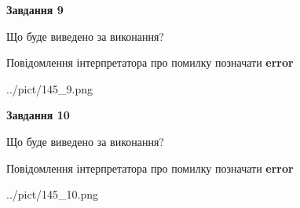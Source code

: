 \documentclass[12pt, ukrainian]{article}
\begin{document}
{{\begin {center}\textbf{Завдання 9}\end {center}}\par
Що буде виведено за виконання? \par
Повідомлення інтерпретатора про помилку позначати \textbf{error}

\begin{center}
	{../pict/145_9.png}
\end{center}
\newpage

{\begin {center}\textbf{Завдання 10}\end {center}}\par
Що буде виведено за виконання? \par
Повідомлення інтерпретатора про помилку позначати \textbf{error}

\begin{center}
	{../pict/145_10.png}
\end{center}
\newpage

}
\end{document}
